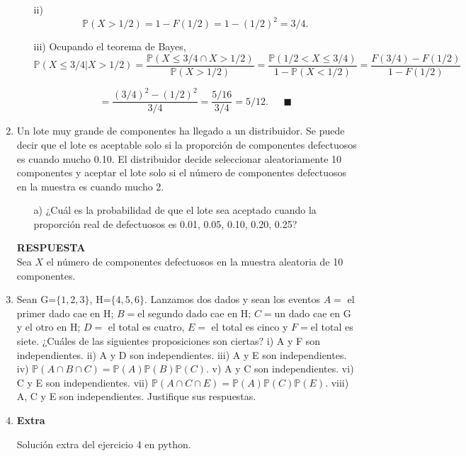 \documentclass[11pt,letterpaper]{article}
\newcommand{\mP}{\mathbb{P}}
\newcommand{\res}{\textbf{RESPUESTA}\\}
\begin{document}
\begin{enumerate}
\begin{itemize}
\item[ii)]$$\mP(X > 1/2)= 1-F(1/2)=1-(1/2)^2=3/4.$$

\item[iii)]Ocupando el teorema de Bayes,
$$\mP(X \leq 3/4|X > 1/2)=\frac{\mP(X\leq 3/4 \cap X>1/2)}{\mP(X>1/2)}=\frac{\mP(1/2<X\leq3/4)}{1-\mP(X<1/2)}=\frac{F(3/4)-F(1/2)}{1-F(1/2)}$$

$$=\frac{(3/4)^2-(1/2)^2}{3/4} =\frac{5/16}{3/4}=5/12. \ \ \ \ \ \ \  \blacksquare$$
\end{itemize}

\item Un lote muy grande de componentes ha llegado a un distribuidor. Se puede decir que el
lote es aceptable solo si la proporción de componentes defectuosos es cuando mucho 0.10.
El distribuidor decide seleccionar aleatoriamente 10 componentes y aceptar el lote solo si el
número de componentes defectuosos en la muestra es cuando mucho 2.

\begin{itemize}
\item[a)] ¿Cuál es la probabilidad de que el lote sea aceptado cuando la proporción real de defectuosos es 0.01, 0.05, 0.10, 0.20, 0.25?
\end{itemize}

\res
Sea $X$ el número de componentes defectuosos en la muestra aleatoria de 10 componentes. 


\item Sean G=$\{1, 2, 3\}$, H=$\{4, 5, 6\}$. Lanzamos dos dados y sean los eventos $A =$ el primer dado cae en H; $B=$el segundo dado cae en H; $C=$un dado cae en G y el otro en H; $D=$ el total es cuatro, $E=$ el total es cinco y $F=$el total es siete. ¿Cuáles de las siguientes proposiciones son ciertas? i) A y F son independientes. ii) A y D son independientes. iii) A
y E son independientes. iv) $\mP(A \cap B \cap C) = \mP (A)\mP (B)\mP (C)$. v) A y C son independientes.
vi) C y E son independientes. vii) $\mP (A \cap C \cap E) = \mP (A)\mP (C)\mP (E)$. viii) A, C y E son
independientes. Justifique sus respuestas.


\item \textbf{Extra} 

Solución extra del ejercicio 4 en python. 




\end{enumerate}
\end{document}
